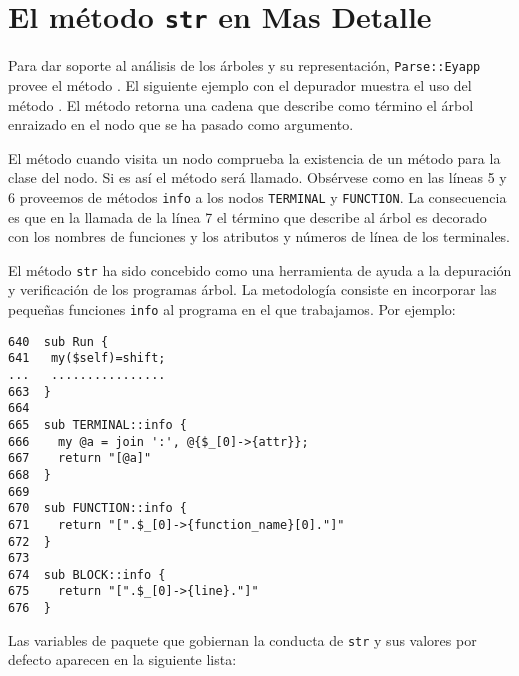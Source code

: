 \section{El método {\tt str} en Mas Detalle}
\label{section:str}

Para dar soporte al análisis de los árboles y su representación, \verb|Parse::Eyapp|
provee el método . El siguiente ejemplo con el depurador muestra el uso del método
.
El método  retorna
una cadena que describe como término el árbol enraizado en el nodo
que se ha pasado como argumento.


El método  cuando visita un nodo comprueba la existencia de 
un método  para la clase del nodo. Si es así el método
será llamado. Obsérvese como en las líneas 5 y 6 proveemos de métodos
\verb|info| a los nodos \verb|TERMINAL| y \verb|FUNCTION|.
La consecuencia es que en la llamada de la línea 7 el término
que describe al árbol es decorado con los nombres de funciones
y los atributos y números de línea de los terminales.




El método \verb|str| ha sido concebido como una herramienta de
ayuda a la depuración y verificación de los programas árbol.
La metodología consiste en incorporar las pequeñas funciones
\verb|info| al programa en el que trabajamos. 
Por ejemplo:

\begin{verbatim}
640  sub Run {
641   my($self)=shift;
...   ................
663  }
664
665  sub TERMINAL::info {
666    my @a = join ':', @{$_[0]->{attr}};
667    return "[@a]"
668  }
669
670  sub FUNCTION::info {
671    return "[".$_[0]->{function_name}[0]."]"
672  }
673
674  sub BLOCK::info {
675    return "[".$_[0]->{line}."]"
676  }
\end{verbatim}


Las variables de paquete que gobiernan la conducta
de \verb|str| y sus valores por defecto aparecen en la siguiente lista:

